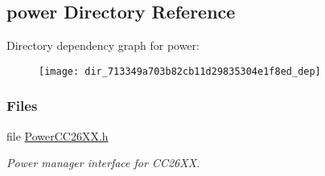\subsection{power Directory Reference}
\label{dir_713349a703b82cb11d29835304e1f8ed}
Directory dependency graph for power\+:
\nopagebreak
\begin{figure}[H]
\begin{center}
\leavevmode
\texttt{[image: dir\_713349a703b82cb11d29835304e1f8ed\_dep]}
\end{center}
\end{figure}
\subsubsection*{Files}
\begin{DoxyCompactItemize}
\item 
file \hyperlink{_power_c_c26_x_x_8h}{Power\+C\+C26\+X\+X.\+h}
\begin{DoxyCompactList}\small\item\em Power manager interface for C\+C26\+X\+X. \end{DoxyCompactList}\end{DoxyCompactItemize}
